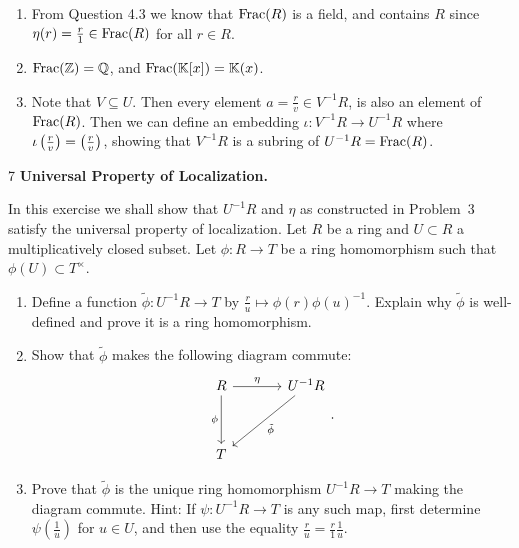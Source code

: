 \documentclass[Notebook.tex]{subfiles}
\begin{document}
\begin{solution}
	\bbni
	\begin{enumerate}
		\item From Question 4.3 we know that $\text{Frac}(R)$ is a field, and contains $R$ since $\eta(r) = \frac{r}{1} \in \text{Frac}(R)$ for all $r \in R$. 
		\item $\text{Frac}(\mathbb Z) = \mathbb Q$, and $\text{Frac}(\mathbb K[x]) = \mathbb K(x)$. 
		\item Note that $V \subseteq U$.
		Then every element $a = \frac{r}{v} \in V^{-1}R$, is also an element of $\text{Frac}(R)$.  Then we can define an embedding $\iota: V^{-1}R \to U^{-1}R$ where $\iota\left(\frac{r}{v}\right) = \left(\frac{r}{v}\right)$, showing that $V^{-1}R$ is a subring of $U^{-1}R = \text{Frac}(R)$.  
	\end{enumerate}
\end{solution}

\newpage 

\begin{problem}{7}
	\textbf{Universal Property of Localization.} 
	
	In this exercise we shall show that $U^{-1}R$ and $\eta$ as constructed in Problem~3 satisfy the universal property of localization. Let $R$ be a ring and $U \subset R$ a multiplicatively closed subset. Let $\phi:R \to T$ be a ring homomorphism such that $\phi(U) \subset T^{\times}$.
	\begin{enumerate}
		\item Define a function $\tilde{\phi}:U^{-1}R \to T$ by $\frac{r}{u}\mapsto \phi(r)\phi(u)^{-1}$. Explain why $\tilde{\phi}$ is well-defined and prove it is a ring homomorphism. 
		\item Show that $\tilde{\phi}$ makes the following diagram commute:
		\[
		\begin{tikzcd}[row sep = 3.5em, column sep = 3.5em]
		R \arrow[r, "\eta"] \arrow[d, swap, "\phi"] & U^{-1}R \arrow[dl, "\tilde{\phi}"] \\
		T  & 
		\end{tikzcd}.
		\]
		\item Prove that $\tilde{\phi}$ is the unique ring homomorphism $U^{-1}R\to T$ making the diagram commute. Hint: If $\psi:U^{-1}R\to T$ is any such map, first determine $\psi\left(\frac{1}{u}\right)$ for $u\in U$, and then use the equality $\frac{r}{u}=\frac{r}{1}\frac{1}{u}$.
	\end{enumerate}
\end{problem}
\end{document}
